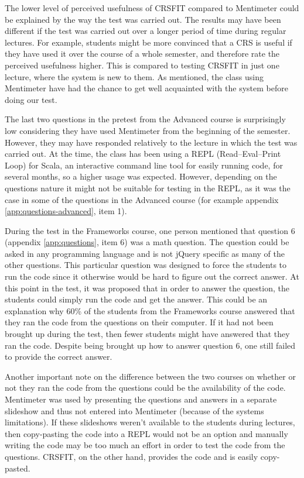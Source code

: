 The lower level of perceived usefulness of CRSFIT compared to Mentimeter could be explained by the way the test was carried out. The results may have been different if the test was carried out over a longer period of time during regular lectures. For example, students might be more convinced that a CRS is useful if they have used it over the course of a whole semester, and therefore rate the perceived usefulness higher. This is compared to testing CRSFIT in just one lecture, where the system is new to them. As mentioned, the class using Mentimeter have had the chance to get well acquainted with the system before doing our test.


The last two questions in the pretest from the Advanced course is surprisingly low considering they have used Mentimeter from the beginning of the semester. However, they may have responded relatively to the lecture in which the test was carried out. At the time, the class has been using a REPL (Read–Eval–Print Loop) for Scala, an interactive command line tool for easily running code, for several months, so a higher usage was expected. However, depending on the questions nature it might not be suitable for testing in the REPL, as it was the case in some of the questions in the Advanced course (for example appendix \ref{app:questions-advanced}, item 1).



During the test in the Frameworks course, one person mentioned that question 6 (appendix \ref{app:questions}, item 6) was a math question. The question could be asked in any programming language and is not jQuery specific as many of the other questions. This particular question was designed to force the students to run the code since it otherwise would be hard to figure out the correct answer. At this point in the test, it was proposed that in order to answer the question, the students could simply run the code and get the answer. This could be an explanation why 60\% of the students from the Frameworks course answered that they ran the code from the questions on their computer. If it had not been brought up during the test, then fewer students might have answered that they ran the code. Despite being brought up how to answer question 6, one still failed to provide the correct answer.

Another important note on the difference between the two courses on whether or not they ran the code from the questions could be the availability of the code. Mentimeter was used by presenting the questions and answers in a separate slideshow and thus not entered into Mentimeter (because of the systems limitations). If these slideshows weren't available to the students during lectures, then copy-pasting the code into a REPL would not be an option and manually writing the code may be too much an effort in order to test the code from the questions. CRSFIT, on the other hand, provides the code and is easily copy-pasted.



